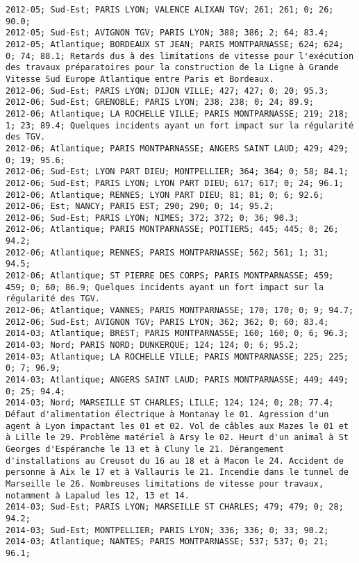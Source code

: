 \documentclass{article}
\begin{document}
\begin{Verbatim}[commandchars=\\\{\}]
2012-05; Sud-Est; PARIS LYON; VALENCE ALIXAN TGV; 261; 261; 0; 26; 90.0; 
2012-05; Sud-Est; AVIGNON TGV; PARIS LYON; 388; 386; 2; 64; 83.4; 
2012-05; Atlantique; BORDEAUX ST JEAN; PARIS MONTPARNASSE; 624; 624; 0; 74; 88.1; Retards dus à des limitations de vitesse pour l'exécution des travaux préparatoires pour la construction de la Ligne à Grande Vitesse Sud Europe Atlantique entre Paris et Bordeaux.
2012-06; Sud-Est; PARIS LYON; DIJON VILLE; 427; 427; 0; 20; 95.3; 
2012-06; Sud-Est; GRENOBLE; PARIS LYON; 238; 238; 0; 24; 89.9; 
2012-06; Atlantique; LA ROCHELLE VILLE; PARIS MONTPARNASSE; 219; 218; 1; 23; 89.4; Quelques incidents ayant un fort impact sur la régularité des TGV.
2012-06; Atlantique; PARIS MONTPARNASSE; ANGERS SAINT LAUD; 429; 429; 0; 19; 95.6; 
2012-06; Sud-Est; LYON PART DIEU; MONTPELLIER; 364; 364; 0; 58; 84.1; 
2012-06; Sud-Est; PARIS LYON; LYON PART DIEU; 617; 617; 0; 24; 96.1; 
2012-06; Atlantique; RENNES; LYON PART DIEU; 81; 81; 0; 6; 92.6; 
2012-06; Est; NANCY; PARIS EST; 290; 290; 0; 14; 95.2; 
2012-06; Sud-Est; PARIS LYON; NIMES; 372; 372; 0; 36; 90.3; 
2012-06; Atlantique; PARIS MONTPARNASSE; POITIERS; 445; 445; 0; 26; 94.2; 
2012-06; Atlantique; RENNES; PARIS MONTPARNASSE; 562; 561; 1; 31; 94.5; 
2012-06; Atlantique; ST PIERRE DES CORPS; PARIS MONTPARNASSE; 459; 459; 0; 60; 86.9; Quelques incidents ayant un fort impact sur la régularité des TGV.
2012-06; Atlantique; VANNES; PARIS MONTPARNASSE; 170; 170; 0; 9; 94.7; 
2012-06; Sud-Est; AVIGNON TGV; PARIS LYON; 362; 362; 0; 60; 83.4; 
2014-03; Atlantique; BREST; PARIS MONTPARNASSE; 160; 160; 0; 6; 96.3; 
2014-03; Nord; PARIS NORD; DUNKERQUE; 124; 124; 0; 6; 95.2; 
2014-03; Atlantique; LA ROCHELLE VILLE; PARIS MONTPARNASSE; 225; 225; 0; 7; 96.9; 
2014-03; Atlantique; ANGERS SAINT LAUD; PARIS MONTPARNASSE; 449; 449; 0; 25; 94.4; 
2014-03; Nord; MARSEILLE ST CHARLES; LILLE; 124; 124; 0; 28; 77.4; Défaut d'alimentation électrique à Montanay le 01. Agression d'un agent à Lyon impactant les 01 et 02. Vol de câbles aux Mazes le 01 et à Lille le 29. Problème matériel à Arsy le 02. Heurt d'un animal à St Georges d'Espéranche le 13 et à Cluny le 21. Dérangement d'installations au Creusot du 16 au 18 et à Macon le 24. Accident de personne à Aix le 17 et à Vallauris le 21. Incendie dans le tunnel de Marseille le 26. Nombreuses limitations de vitesse pour travaux, notamment à Lapalud les 12, 13 et 14.
2014-03; Sud-Est; PARIS LYON; MARSEILLE ST CHARLES; 479; 479; 0; 28; 94.2; 
2014-03; Sud-Est; MONTPELLIER; PARIS LYON; 336; 336; 0; 33; 90.2; 
2014-03; Atlantique; NANTES; PARIS MONTPARNASSE; 537; 537; 0; 21; 96.1; 

\end{Verbatim}
\end{document}
